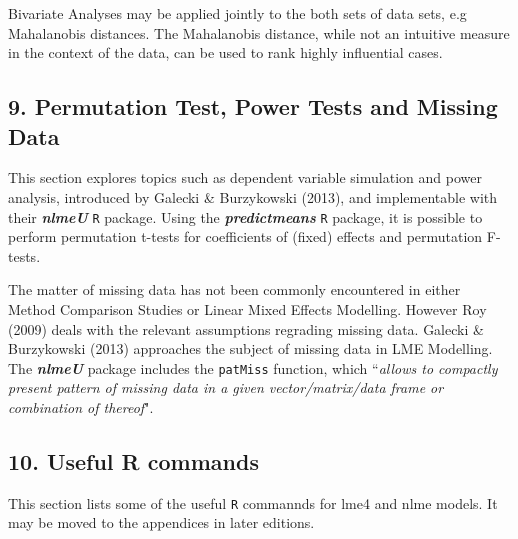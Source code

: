 \documentclass[Main.tex]{subfiles}
\begin{document}
Bivariate Analyses may be applied jointly to the both sets of data sets, e.g Mahalanobis distances. The Mahalanobis distance, while not an intuitive measure in the context of the data, can be used to rank highly influential cases. 

\subsection*{9. Permutation Test, Power Tests and Missing Data }

This section explores topics such as dependent variable simulation and power analysis, introduced by Galecki \& Burzykowski (2013), and implementable with their \textbf{\textit{nlmeU}} \texttt{R} package.
Using the \textbf{\textit{predictmeans}} \texttt{R} package, it is possible to perform permutation t-tests for coefficients of (fixed) effects and permutation F-tests.

The matter of missing data has not been commonly encountered in either Method Comparison Studies or Linear Mixed Effects Modelling. However Roy (2009) deals with the relevant assumptions regrading missing data. Galecki \& Burzykowski (2013) approaches the subject of missing data in LME Modelling. The \textbf{\textit{nlmeU}} package includes the \texttt{patMiss} function, which ``\textit{allows to compactly present pattern of missing data in a given vector/matrix/data
frame or combination of thereof}".



\subsection*{10. Useful R commands }
This section lists some of the useful \texttt{R} commannds for lme4 and nlme models. It may be moved to the appendices in later editions.


\end{document}
